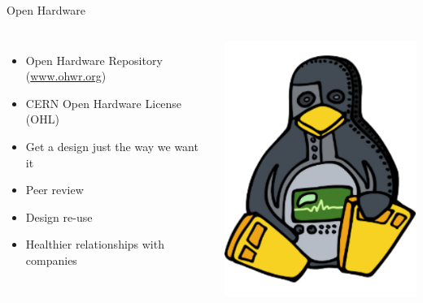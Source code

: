 \documentclass[compress,red]{beamer}
\begin{document}
\begin{frame}{Open Hardware}

  \begin{columns}[c]

      \begin{itemize}
        \item Open Hardware Repository (\href{http://ohwr.org}{www.ohwr.org})
	\item CERN Open Hardware License (OHL)
	\item Get a design just the way we want it
	\item Peer review
	\item Design re-use
	\item Healthier relationships with companies
      \end{itemize}


    \begin{center}
      \includegraphics[width=1.0\textwidth]{ohwr/ohr_logo.pdf}  
    \end{center}

  \end{columns}
\end{frame}
\end{document}
